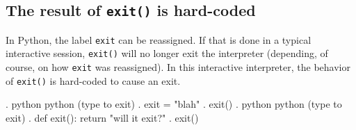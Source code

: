 \documentclass{article}
\begin{document}
\subsection{The result of \lstinline$exit()$ is hard-coded}

In Python, the label \lstinline$exit$ can be reassigned. If that is done in a typical interactive session, \lstinline$exit()$ will no longer exit the interpreter (depending, of course, on how \lstinline$exit$ was reassigned). In this interactive interpreter, the behavior of \lstinline$exit()$ is hard-coded to cause an exit.

\begin{stlog}
{\smallskip}
. python
 python (type {} to exit) 
. exit = "blah"
{\smallskip}
. exit()
{\smallskip}
. python
 python (type {} to exit) 
. def exit(): return "will it exit?"
{\smallskip}
. exit()
\end{stlog}

		
\end{document}
